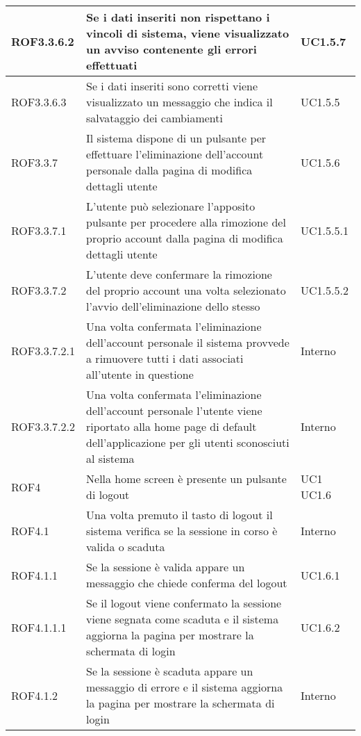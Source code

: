 \begin{center}
\begin{longtable}{| p{2.5cm} | p{8cm} | p{2cm} |}
		\hline
		ROF3.3.6.2  &  Se i dati inseriti non rispettano i vincoli di sistema, viene visualizzato un avviso contenente gli errori effettuati  &  UC1.5.7 \\
		\hline
		ROF3.3.6.3  &  Se i dati inseriti sono corretti viene visualizzato un messaggio che indica il salvataggio dei cambiamenti  &  UC1.5.5 \\
		\hline
		ROF3.3.7  &  Il sistema dispone di un pulsante per effettuare l'eliminazione dell'account personale dalla pagina di modifica dettagli utente  &  UC1.5.6 \\
		\hline
		ROF3.3.7.1  &  L'utente può selezionare l'apposito pulsante per procedere alla rimozione del proprio account dalla pagina di modifica dettagli utente  &  UC1.5.5.1 \\
		\hline
		ROF3.3.7.2  &  L'utente deve confermare la rimozione del proprio account una volta selezionato l'avvio dell'eliminazione dello stesso  &  UC1.5.5.2 \\
		\hline
		ROF3.3.7.2.1  &  Una volta confermata l'eliminazione dell'account personale il sistema provvede a rimuovere tutti i dati associati all'utente in questione  &  Interno \\
		\hline
		ROF3.3.7.2.2  &  Una volta confermata l'eliminazione dell'account personale l'utente viene riportato alla home page di default dell'applicazione per gli utenti sconosciuti al sistema  &  Interno \\


		\hline
		ROF4  &  Nella home screen è presente un pulsante di logout  &  UC1 \newline UC1.6 \\
		\hline
		ROF4.1  &  Una volta premuto il tasto di logout il sistema verifica se la sessione in corso è valida o scaduta  &  Interno \\
		\hline
		ROF4.1.1  &  Se la sessione è valida appare un messaggio che chiede conferma del logout  &  UC1.6.1 \\
		\hline
		ROF4.1.1.1  &  Se il logout viene confermato la sessione viene segnata come scaduta e il sistema aggiorna la pagina per mostrare la schermata di login  &  UC1.6.2 \\
		\hline
		ROF4.1.2  &  Se la sessione è scaduta appare un messaggio di errore e il sistema aggiorna la pagina per mostrare la schermata di login  &  Interno \\



\end{longtable}
\end{center}
